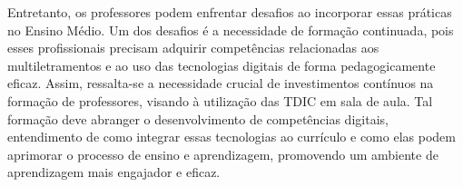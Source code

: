 \documentclass[portuguese]{textolivre}
\begin{document}
Entretanto, os professores podem enfrentar desafios ao incorporar essas práticas no Ensino Médio. Um dos desafios é a necessidade de formação continuada, pois esses profissionais precisam adquirir competências relacionadas aos multiletramentos e ao uso das tecnologias digitais de forma pedagogicamente eficaz. Assim, ressalta-se a necessidade crucial de investimentos contínuos na formação de professores, visando à utilização das TDIC em sala de aula. Tal formação deve abranger o desenvolvimento de competências digitais, entendimento de como integrar essas tecnologias ao currículo e como elas podem aprimorar o processo de ensino e aprendizagem, promovendo um ambiente de aprendizagem mais engajador e eficaz.



\printbibliography\label{sec-bib}
\end{document}
